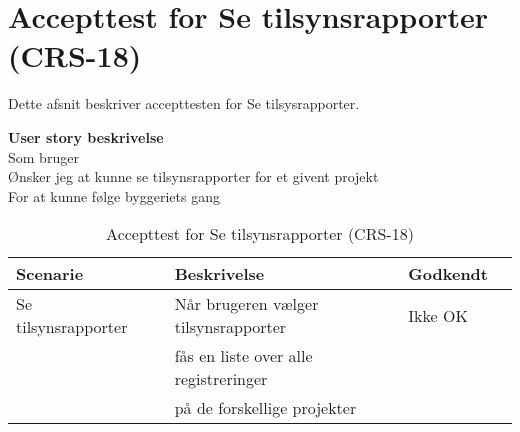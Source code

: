 \section{Accepttest for Se tilsynsrapporter (CRS-18)}
Dette afsnit beskriver accepttesten for Se tilsysrapporter.

\textbf{User story beskrivelse} \\
Som bruger \\
Ønsker jeg at kunne se tilsynsrapporter for et givent projekt \\
For at kunne følge byggeriets gang

\begin{table}[H]
	\centering
	\begin{tabular}{|ll|l|ll|} \hline
		\textbf{Scenarie} &  & \textbf{Beskrivelse}&  \textbf{Godkendt}&  \\ \hline
		Se tilsynsrapporter&  &  Når brugeren vælger tilsynsrapporter &  Ikke OK&  \\
		& & fås en liste over alle registreringer & & \\
		& & på de forskellige projekter& & \\ \hline
	\end{tabular}
	\caption{Accepttest for Se tilsynsrapporter (CRS-18)}
	\label{AcceptTilsyn}
\end{table}